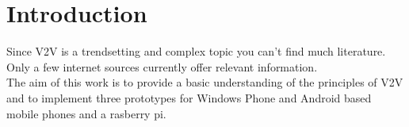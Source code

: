 \chapter{Introduction}
\label{cha:Introduction}
Since V2V is a trendsetting and complex topic you can't find much literature. Only a few internet sources currently offer relevant information.\\
The aim of this work is to provide a basic understanding of the principles of V2V and to implement three prototypes for Windows Phone and Android based mobile phones and a rasberry pi.\\